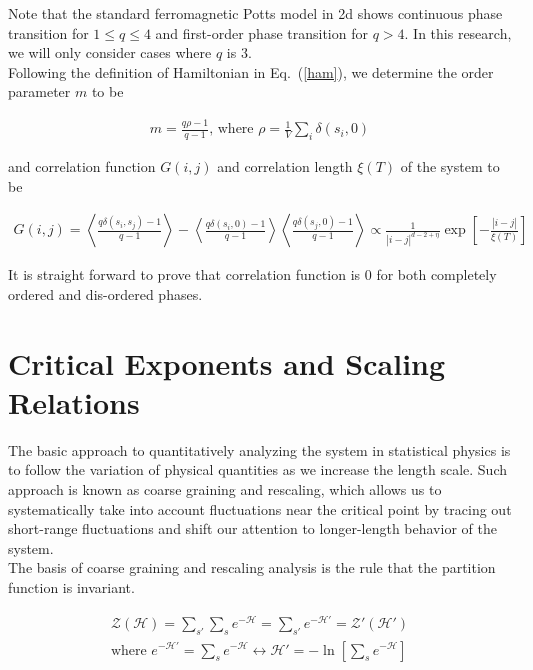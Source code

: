 \documentclass[%
 reprint,
 amsmath,amssymb,
 aps,
]{revtex4-2}
\begin{document}
Note that the standard ferromagnetic Potts model in 2d shows continuous phase transition 
for $1 \leq q \leq 4$ and first-order phase transition for $q>4$. In this research, we 
will only consider cases where $q$ is $3$.\\

Following the definition of Hamiltonian in Eq.~(\ref{ham}), we determine the order 
parameter $m$ to be

\begin{eqnarray}
m = \frac{q \rho - 1}{q - 1} \text{, where } \rho = \frac{1}{V} \sum_{i} 
\delta(s_{i},0) \label{order}
\end{eqnarray}

and correlation function $G(i,j)$ and correlation length $\xi(T)$ of the system to be

\begin{widetext}
\begin{eqnarray}
G(i,j) = \left<\frac{q \delta(s_{i}, s_{j}) - 1}{q - 1}\right> - \left<\frac{q 
\delta(s_{i}, 0) - 1}{q - 1}\right> \left<\frac{q \delta(s_{j}, 0) - 1}{q - 1}\right> 
\propto \frac{1}{|i-j|^{d-2+\eta}} \exp \left[-\frac{|i-j|}{\xi(T)}\right] \label{corr}
\end{eqnarray}
\end{widetext}

It is straight forward to prove that correlation function is $0$ for both completely 
ordered and dis-ordered phases.

\section{\label{sec:scaling} Critical Exponents and Scaling Relations}

The basic approach to quantitatively analyzing the system in statistical physics is 
to follow the variation of physical quantities as we increase the length scale. Such 
approach is known as coarse graining and rescaling, which allows us to systematically 
take into account fluctuations near the critical point by tracing out short-range 
fluctuations and shift our attention to longer-length behavior of the system. \\

The basis of coarse graining and rescaling analysis is the rule that the partition 
function is invariant.

\begin{gather}
\mathcal{Z}(\mathcal{H}) = \sum_{s'}\sum_{s}e^{-\mathcal{H}} = \sum_{s'}
e^{-\mathcal{H}'} = \mathcal{Z}'\left(\mathcal{H}'\right) \label{parequal}\\
\text{where } e^{-\mathcal{H}'} = \sum_{s} e^{-\mathcal{H}} \leftrightarrow 
\mathcal{H}' = - \ln \left[\sum_{s} e^{-\mathcal{H}}\right] \label{eqn:newHam}
\end{gather}
\end{document}
